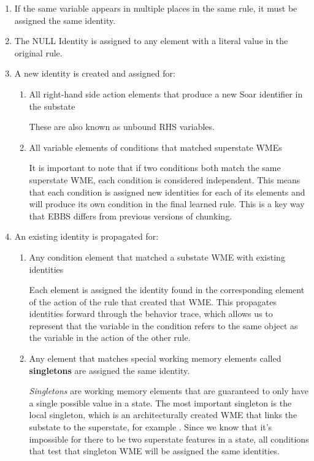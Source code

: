 \begin{enumerate}
	\item If the same variable appears in multiple places in the same rule, it must be assigned the same identity.

	\item The NULL Identity is assigned to any element with a literal value in the original rule.

	\item A new identity is created and assigned for:
	\begin{enumerate}
		\item All right-hand side action elements that produce a new Soar identifier in the substate

		These are also known as unbound RHS variables.

		\item All variable elements of conditions that matched superstate WMEs

		It is important to note that if two conditions both match the same superstate WME, each condition is considered independent.  This means that each condition is assigned new identities for each of its elements and will produce its own condition in the final learned rule.  This is a key way that EBBS differs from previous versions of chunking.
	\end{enumerate}
	\item An existing identity is propagated for:

	\begin{enumerate}
		\item Any condition element that matched a substate WME with existing identities

		Each element is assigned the identity found in the corresponding element of the action of the rule that created that WME.  This propagates identities forward through the behavior trace, which allows us to represent that the variable in the condition refers to the same object as the variable in the action of the other rule.

		\item Any element that matches special working memory elements called \textbf{singletons} are assigned the same identity.

		\label{CHUNKING-singletons1}
		\textit{Singletons} are working memory elements that are guaranteed to only have a single possible value in a state.  The most important singleton is the local  singleton, which is an architecturally created WME that links the substate to the superstate, for example .  Since we know that it's impossible for there to be two superstate features in a state, all conditions that test that singleton WME will be assigned the same identities.


\end{enumerate}
\end{enumerate}
